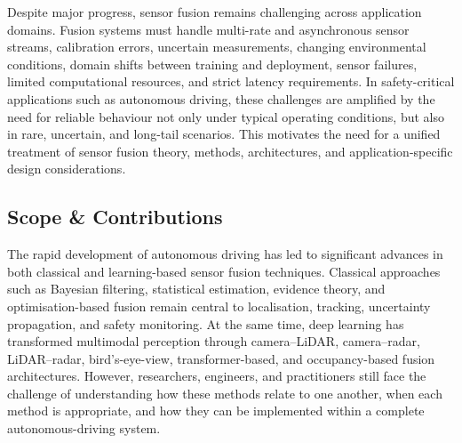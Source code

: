\documentclass{ieeeaccess}
\begin{document}
Despite major progress, sensor fusion remains challenging across application domains. Fusion systems must handle multi-rate and asynchronous sensor streams, calibration errors, uncertain measurements, changing environmental conditions, domain shifts between training and deployment, sensor failures, limited computational resources, and strict latency requirements. In safety-critical applications such as autonomous driving, these challenges are amplified by the need for reliable behaviour not only under typical operating conditions, but also in rare, uncertain, and long-tail scenarios. This motivates the need for a unified treatment of sensor fusion theory, methods, architectures, and application-specific design considerations.

\subsection{Scope \& Contributions}

The rapid development of autonomous driving has led to significant advances in both classical and learning-based sensor fusion techniques. Classical approaches such as Bayesian filtering, statistical estimation, evidence theory, and optimisation-based fusion remain central to localisation, tracking, uncertainty propagation, and safety monitoring. At the same time, deep learning has transformed multimodal perception through camera--LiDAR, camera--radar, LiDAR--radar, bird's-eye-view, transformer-based, and occupancy-based fusion architectures. However, researchers, engineers, and practitioners still face the challenge of understanding how these methods relate to one another, when each method is appropriate, and how they can be implemented within a complete autonomous-driving system.
\end{document}
